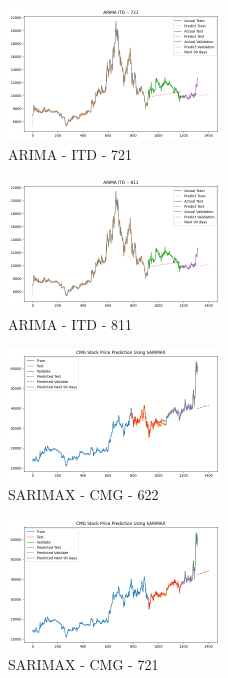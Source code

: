 \documentclass{ieeeojies}
\begin{document}
\begin{figure} [H]
    \centering
    \includegraphics[width=0.5\textwidth]{bibliography/Figure/ARIMA_ITD_721_90.png}
    \caption{ARIMA - ITD - 721}
    \label{fig:ARIMA_ITD_721_90}
\end{figure}
\begin{figure} [H]
    \centering
    \includegraphics[width=0.5\textwidth]{bibliography/Figure/ARIMA_ITD_811_90.png}
    \caption{ARIMA - ITD - 811}
    \label{fig:ARIMA_ITD_811_90}
\end{figure}
\begin{figure} [H]
    \centering
    \includegraphics[width=0.5\textwidth]{bibliography/Figure/SARIMAX_CMG_622_90.png}
    \caption{SARIMAX - CMG - 622}
    \label{fig:SARIMAX_CMG_622_90}
\end{figure}
\begin{figure} [H]
    \centering
    \includegraphics[width=0.5\textwidth]{bibliography/Figure/SARIMAX_CMG_721_90.png}
    \caption{SARIMAX - CMG - 721}
    \label{fig:SARIMAX_CMG_721_90}
\end{figure}
\end{document}
